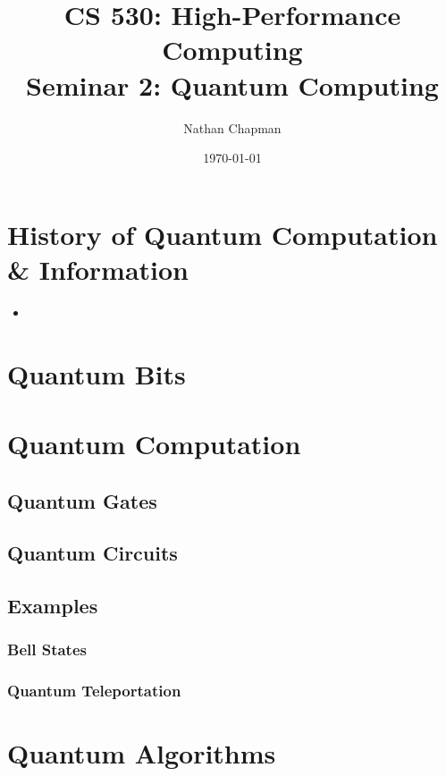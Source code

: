 \documentclass{article}
\title{CS 530: High-Performance Computing \\ Seminar 2: Quantum Computing}
\author{Nathan Chapman}
\affil{Department of Computer Science \\ Central Washington University}
\date{\today}
\begin{document}
\maketitle

\tableofcontents

\section{History of Quantum Computation \& Information}

    \begin{itemize}
        \item 
    \end{itemize}

\section{Quantum Bits}

\section{Quantum Computation}

    \subsection{Quantum Gates}

    \subsection{Quantum Circuits}

    \subsection{Examples}

        \subsubsection{Bell States}

        \subsubsection{Quantum Teleportation}

\section{Quantum Algorithms}
\end{document}
